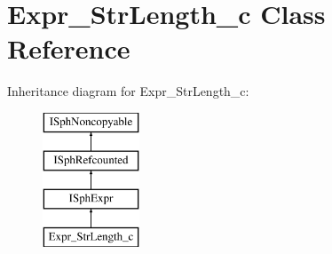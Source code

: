 \hypertarget{classExpr__StrLength__c}{\section{Expr\-\_\-\-Str\-Length\-\_\-c Class Reference}
\label{classExpr__StrLength__c}
}
Inheritance diagram for Expr\-\_\-\-Str\-Length\-\_\-c\-:\begin{figure}[H]
\begin{center}
\leavevmode
\includegraphics[height=4.000000cm]{classExpr__StrLength__c}
\end{center}
\end{figure}
